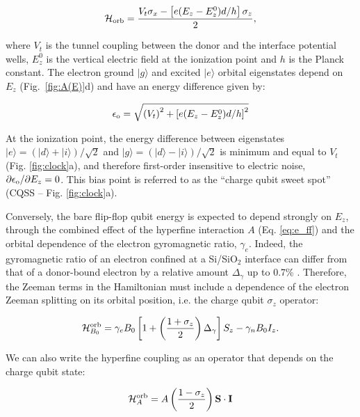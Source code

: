 \documentclass[aps,prb,superscriptaddress,nobibnotes,twocolumn]{revtex4-1}
\begin{document}
\begin{equation} \label{eq:H_orb}
\mathcal{H}_{\rm orb}=\frac{V_t \sigma_x-\left[e(E_z - E_z^0) d/h\right]\sigma_z}{2},
\end{equation}

where $V_t$ is the tunnel coupling between the donor and the interface potential wells, $E_z^0$ is the vertical electric field at the ionization point and $h$ is the Planck constant. The electron ground $|g\rangle$ and excited $|e\rangle$ orbital eigenstates depend on $E_z$ (Fig.~\ref{fig:A(E)}d) and have an energy difference given by:

\begin{equation} \label{eq:e_o}
\epsilon_{\rm o}=\sqrt{\left(V_t\right)^2+\left[e(E_z - E_z^0) d/h\right]^2}
\end{equation}

At the ionization point, the energy difference between eigenstates $|e\rangle=(|d\rangle+|i\rangle)/\sqrt{2}$ and $|g\rangle=(|d\rangle-|i\rangle)/\sqrt{2}$ is minimum and equal to $V_t$ (Fig. \ref{fig:clock}a), and therefore first-order insensitive to electric noise, $\partial\epsilon_{\rm o}/\partial E_z=0$. This bias point is referred to as the ``charge qubit sweet spot''\cite{Kim2015a} (CQSS -- Fig. \ref{fig:clock}a).

Conversely, the bare flip-flop qubit energy is expected to depend strongly on $E_z$, through the combined effect of the hyperfine interaction $A$ (Eq. \ref{eq:e_ff}) and the orbital dependence of the electron gyromagnetic ratio, $\gamma_e$. Indeed, the gyromagnetic ratio of an electron confined at a Si/SiO$_2$ interface can differ from that of a donor-bound electron by a relative amount $\Delta_{\gamma}$ up to 0.7\% \cite{Rahman2009a}. Therefore, the Zeeman terms in the Hamiltonian must include a dependence of the electron Zeeman splitting on its orbital position, i.e. the charge qubit $\sigma_z$ operator:

\begin{equation} \label{eq:H_Zeeman_orb}
\mathcal{H}_{B_0}^{\rm orb}=\gamma_e B_0\left[1+\left(\frac{1+\sigma_z}{2}\right)\Delta_\gamma\right]S_z - \gamma_n B_0 I_z.
\end{equation}

We can also write the hyperfine coupling as an operator that depends on the charge qubit state:

\begin{equation} \label{eq:H_A}
\mathcal{H}_{A}^{\rm orb}=A\left(\frac{1 - \sigma_z}{2}\right){\bf S\cdot I}
\end{equation}
\end{document}

